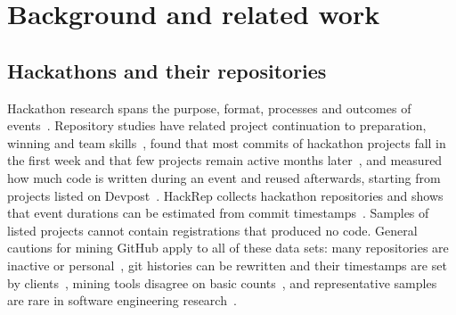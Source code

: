 \documentclass{article}
\begin{document}
\section{Background and related work}\label{sec:related}

\subsection{Hackathons and their repositories}
Hackathon research spans the purpose, format, processes and outcomes of events~\cite{chau2023hackathons}. Repository studies have related project continuation to preparation, winning and team skills~\cite{nolte2020hackathon}, found that most commits of hackathon projects fall in the first week and that few projects remain active months later~\cite{mcintosh2021hackathon}, and measured how much code is written during an event and reused afterwards, starting from \devpostprojects{} projects listed on Devpost~\cite{imam2021secretlife,mahmoud2022oneoff}. HackRep collects \hackrepsize{} hackathon repositories and shows that event durations can be estimated from commit timestamps~\cite{halmans2026hackrep}. Samples of listed projects cannot contain registrations that produced no code. General cautions for mining GitHub apply to all of these data sets: many repositories are inactive or personal~\cite{kalliamvakou2014perils}, git histories can be rewritten and their timestamps are set by clients~\cite{bird2009git}, mining tools disagree on basic counts~\cite{hoess2025toolmatter}, and representative samples are rare in software engineering research~\cite{baltes2022sampling}.
\end{document}
